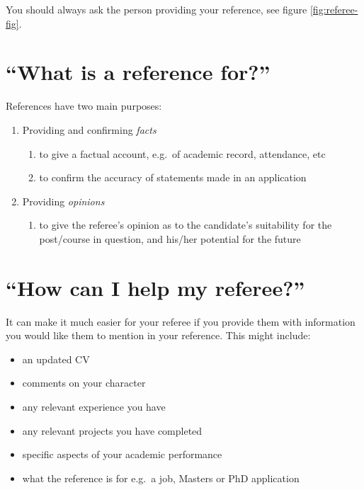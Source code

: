 \documentclass[
  12pt,
]{book}
\providecommand{\tightlist}{%
  \setlength{\itemsep}{0pt}\setlength{\parskip}{0pt}}
\begin{document}
You should always ask the person providing your reference, see figure \ref{fig:referee-fig}.

\hypertarget{for}{%
\section{``What is a reference for?''}\label{for}}

References have two main purposes:

\begin{enumerate}
\def\labelenumi{\arabic{enumi}.}
\tightlist
\item
  Providing and confirming \emph{facts}

  \begin{enumerate}
  \def\labelenumii{\roman{enumii}.}
  \tightlist
  \item
    to give a factual account, e.g.~of academic record, attendance, etc
  \item
    to confirm the accuracy of statements made in an application
  \end{enumerate}
\item
  Providing \emph{opinions}

  \begin{enumerate}
  \def\labelenumii{\roman{enumii}.}
  \tightlist
  \item
    to give the referee's opinion as to the candidate's suitability for the post/course in
    question, and his/her potential for the future
  \end{enumerate}
\end{enumerate}

\hypertarget{help}{%
\section{``How can I help my referee?''}\label{help}}

It can make it much easier for your referee if you provide them with information you would like them to mention in your reference. This might include:

\begin{itemize}
\tightlist
\item
  an updated CV\\
\item
  comments on your character
\item
  any relevant experience you have
\item
  any relevant projects you have completed
\item
  specific aspects of your academic performance
\item
  what the reference is for e.g.~a job, Masters or PhD application
\end{itemize}
\end{document}
